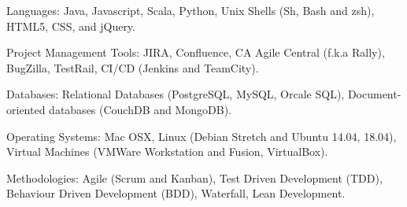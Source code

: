 \documentclass[10pt,a4paper]{article}
\begin{document}
\inlineheadsection 
  {Languages:}
  {Java, Javascript, Scala, Python, Unix Shells (Sh, Bash and zsh), HTML5, CSS, and jQuery.}
  
\inlineheadsection 
  {Project Management Tools:}
  {JIRA, Confluence, CA Agile Central (f.k.a Rally), BugZilla, TestRail, CI/CD (Jenkins and TeamCity).}

\inlineheadsection 
  {Databases:}
  {Relational Databases (PostgreSQL, MySQL, Orcale SQL), Document-oriented databases (CouchDB and MongoDB).}
  
\inlineheadsection 
  {Operating Systems:}
  {Mac OSX, Linux (Debian Stretch and Ubuntu 14.04, 18.04), Virtual Machines (VMWare Workstation and Fusion, VirtualBox).}
  
\inlineheadsection 
  {Methodologies:}
  {Agile (Scrum and Kanban), Test Driven Development (TDD), Behaviour Driven Development (BDD), Waterfall, Lean Development.}
  

\vspace{1em}
\spacedhrule{0em}{-0.4em}

\end{document}
